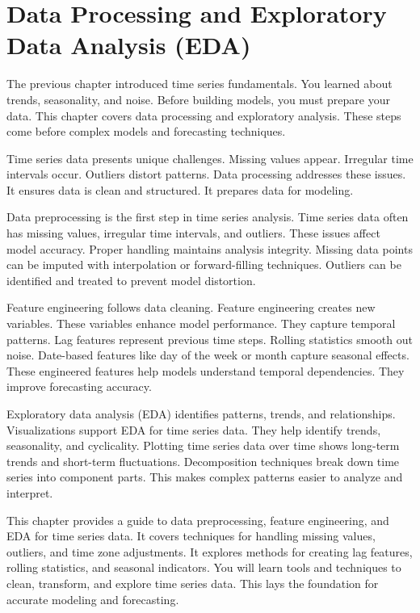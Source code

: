 \chapter{Data Processing and Exploratory Data Analysis (EDA)}

The previous chapter introduced time series fundamentals. You learned about trends, seasonality, and noise. Before building models, you must prepare your data. This chapter covers data processing and exploratory analysis. These steps come before complex models and forecasting techniques.

Time series data presents unique challenges. Missing values appear. Irregular time intervals occur. Outliers distort patterns. Data processing addresses these issues. It ensures data is clean and structured. It prepares data for modeling.

Data preprocessing is the first step in time series analysis. Time series data often has missing values, irregular time intervals, and outliers. These issues affect model accuracy. Proper handling maintains analysis integrity. Missing data points can be imputed with interpolation or forward-filling techniques. Outliers can be identified and treated to prevent model distortion.

Feature engineering follows data cleaning. Feature engineering creates new variables. These variables enhance model performance. They capture temporal patterns. Lag features represent previous time steps. Rolling statistics smooth out noise. Date-based features like day of the week or month capture seasonal effects. These engineered features help models understand temporal dependencies. They improve forecasting accuracy.

Exploratory data analysis (EDA) identifies patterns, trends, and relationships. Visualizations support EDA for time series data. They help identify trends, seasonality, and cyclicality. Plotting time series data over time shows long-term trends and short-term fluctuations. Decomposition techniques break down time series into component parts. This makes complex patterns easier to analyze and interpret.

This chapter provides a guide to data preprocessing, feature engineering, and EDA for time series data. It covers techniques for handling missing values, outliers, and time zone adjustments. It explores methods for creating lag features, rolling statistics, and seasonal indicators. You will learn tools and techniques to clean, transform, and explore time series data. This lays the foundation for accurate modeling and forecasting.





